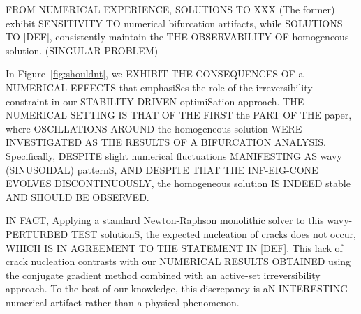 FROM NUMERICAL EXPERIENCE, SOLUTIONS TO XXX (The former) exhibit SENSITIVITY TO numerical bifurcation artifacts, while SOLUTIONS TO [DEF], consistently maintain the THE OBSERVABILITY OF homogeneous solution. (SINGULAR PROBLEM)

In Figure~\ref{fig:shouldnt}, we EXHIBIT THE CONSEQUENCES OF a NUMERICAL EFFECTS that emphasiSes the role of the irreversibility constraint in our STABILITY-DRIVEN optimiSation approach. THE NUMERICAL SETTING IS THAT OF THE FIRST the PART OF THE paper, where OSCILLATIONS AROUND the homogeneous solution WERE INVESTIGATED AS THE RESULTS OF A BIFURCATION ANALYSIS. Specifically, DESPITE slight numerical fluctuations MANIFESTING AS wavy (SINUSOIDAL) patternS, AND DESPITE THAT THE INF-EIG-CONE EVOLVES DISCONTINUOUSLY, the homogeneous solution IS INDEED stable AND SHOULD BE OBSERVED.

IN FACT, Applying a standard Newton-Raphson monolithic solver to this  wavy-PERTURBED TEST solutionS, the expected nucleation of cracks does not occur, WHICH IS IN AGREEMENT TO THE STATEMENT IN [DEF]. This lack of crack nucleation contrasts with our NUMERICAL RESULTS OBTAINED using the conjugate gradient method combined with an active-set irreversibility approach. To the best of our knowledge, this discrepancy is aN INTERESTING numerical artifact rather than a physical phenomenon.